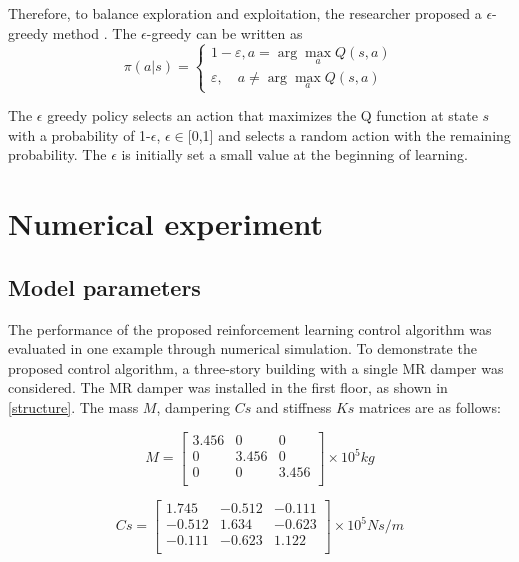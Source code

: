 Therefore, to balance exploration and exploitation, the researcher proposed a $\epsilon$-greedy method \citep{sutton}. The $\epsilon$-greedy can be written as
\begin{equation}
\pi(a | s)=\left\{\begin{array}{c}
{1-\varepsilon, a=\arg \max _{a} Q(s, a)} \\
{\varepsilon, \quad a \neq \arg \max _{a} Q(s, a)}
\end{array}\right.
\end{equation}

The $\epsilon$ greedy policy selects an action that maximizes the Q function at state $s$ with a probability of 1-$\epsilon$, $\epsilon \in$[0,1] and selects a random action with the remaining probability. The $\epsilon$ is initially set a small value at the beginning of learning.

\section{Numerical experiment}
\subsection{Model parameters}
The performance of the proposed reinforcement learning control algorithm was evaluated in one example through numerical simulation. To demonstrate the proposed control algorithm, a three-story building with a single MR damper was considered. The MR damper was installed in the first floor, as shown in \ref{structure}. The mass $M$, dampering $Cs$ and stiffness $Ks$ matrices are as follows:

\begin{equation}       
M=\left[                 
  \begin{array}{ccc}   
   3.456 & 0 & 0 \\  
    0 & 3.456 & 0 \\ 
   0 & 0 &  3.456 \\
  \end{array}
\right]     
\times 10^{5} kg        
\end{equation}

\begin{equation}       
Cs=\left[                 
  \begin{array}{ccc}   
    1.745 & -0.512 & -0.111\\
    -0.512 & 1.634 & -0.623 \\
    -0.111 & -0.623 & 1.122 \\
  \end{array}
\right]     
\times 10^{5} N s/m        
\end{equation}

